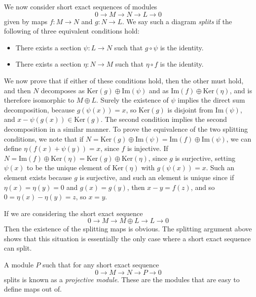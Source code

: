 We now consider short exact sequences of modules
%
\[ 0 \to M \to N \to L \to 0 \]
%
given by maps $f: M \to N$ and $g: N \to L$. We say such a diagram \emph{splits} if the following of three equivalent conditions hold:
%
\begin{itemize}
    \item There exists a section $\psi: L \to N$ such that $g \circ \psi$ is the identity.

    \item There exists a section $\eta: N \to M$ such that $\eta \circ f$ is the identity.
\end{itemize}
%
We now prove that if either of these conditions hold, then the other must hold, and then $N$ decomposes as $\text{Ker}(g) \oplus \text{Im}(\psi)$ and as $\text{Im}(f) \oplus \text{Ker}(\eta)$, and is therefore isomorphic to $M \oplus L$. Surely the existence of $\psi$ implies the direct sum decomposition, because $g(\psi(x)) = x$, so $\text{Ker}(g)$ is disjoint from $\text{Im}(\psi)$, and $x - \psi(g(x)) \in \text{Ker}(g)$. The second condition implies the second decomposition in a similar manner. To prove the equivalence of the two splitting conditions, we note that if $N = \text{Ker}(g) \oplus \text{Im}(\psi) = \text{Im}(f) \oplus \text{Im}(\psi)$, we can define $\eta(f(x) + \psi(y)) = x$, since $f$ is injective. If $N = \text{Im}(f) \oplus \text{Ker}(\eta) = \text{Ker}(g) \oplus \text{Ker}(\eta)$, since $g$ is surjective, setting $\psi(x)$ to be the unique element of $\text{Ker}(\eta)$ with $g(\psi(x)) = x$. Such an element exists because $g$ is surjective, and such an element is unique since if $\eta(x) = \eta(y) = 0$ and $g(x) = g(y)$, then $x - y = f(z)$, and so $0 = \eta(x) - \eta(y) = z$, so $x = y$.

\begin{remark}
    If we are considering the short exact sequence
    \[ 0 \to M \to M \oplus L \to L \to 0 \]
    Then the existence of the splitting maps is obvious. The splitting argument above shows that this situation is essentially the only case where a short exact sequence can split.
\end{remark}

A module $P$ such that for any short exact sequence
%
\[ 0 \to M \to N \to P \to 0 \]
%
splits is known as a \emph{projective module}. These are the modules that are easy to define maps out of.

